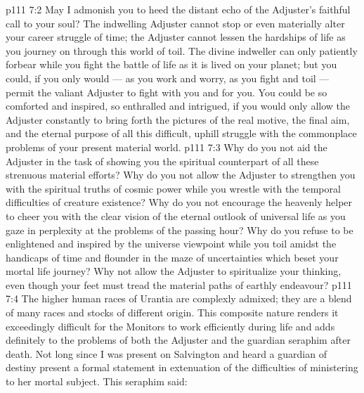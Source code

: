 \vs p111 7:2 \pc May I admonish you to heed the distant echo of the Adjuster’s faithful call to your soul? The indwelling Adjuster cannot stop or even materially alter your career struggle of time; the Adjuster cannot lessen the hardships of life as you journey on through this world of toil. The divine indweller can only patiently forbear while you fight the battle of life as it is lived on your planet; but you could, if you only would --- as you work and worry, as you fight and toil --- permit the valiant Adjuster to fight with you and for you. You could be so comforted and inspired, so enthralled and intrigued, if you would only allow the Adjuster constantly to bring forth the pictures of the real motive, the final aim, and the eternal purpose of all this difficult, uphill struggle with the commonplace problems of your present material world.
\vs p111 7:3 Why do you not aid the Adjuster in the task of showing you the spiritual counterpart of all these strenuous material efforts? Why do you not allow the Adjuster to strengthen you with the spiritual truths of cosmic power while you wrestle with the temporal difficulties of creature existence? Why do you not encourage the heavenly helper to cheer you with the clear vision of the eternal outlook of universal life as you gaze in perplexity at the problems of the passing hour? Why do you refuse to be enlightened and inspired by the universe viewpoint while you toil amidst the handicaps of time and flounder in the maze of uncertainties which beset your mortal life journey? Why not allow the Adjuster to spiritualize your thinking, even though your feet must tread the material paths of earthly endeavour?
\vs p111 7:4 The higher human races of Urantia are complexly admixed; they are a blend of many races and stocks of different origin. This composite nature renders it exceedingly difficult for the Monitors to work efficiently during life and adds definitely to the problems of both the Adjuster and the guardian seraphim after death. Not long since I was present on Salvington and heard a guardian of destiny present a formal statement in extenuation of the difficulties of ministering to her mortal subject. This seraphim said:
